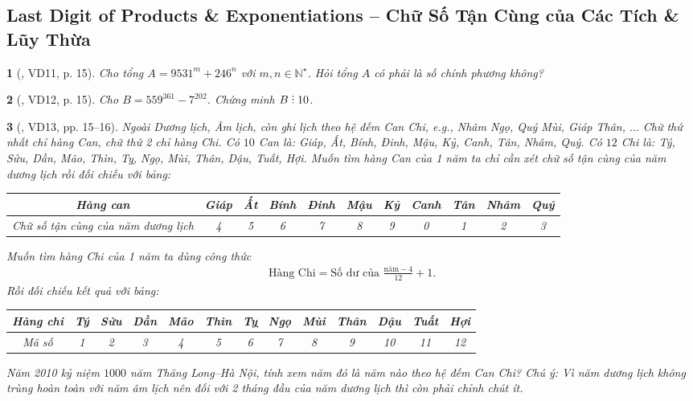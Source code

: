 \documentclass{article}
\newtheorem{baitoan}{}
\DeclareRobustCommand{\divby}{%
	\mathrel{\vbox{\baselineskip.65ex\lineskiplimit0pt\hbox{.}\hbox{.}\hbox{.}}}%
}
\begin{document}

\subsection{Last Digit of Products \& Exponentiations -- Chữ Số Tận Cùng của Các Tích \& Lũy Thừa}

\begin{baitoan}[\cite{Tuyen_Toan_6}, VD11, p. 15]
	Cho tổng $A = 9531^m + 246^n$ với $m,n\in\mathbb{N}^\star$. Hỏi tổng $A$ có phải là số chính phương không?
\end{baitoan}

\begin{baitoan}[\cite{Tuyen_Toan_6}, VD12, p. 15]
	Cho $B = 559^{361} - 7^{202}$. Chứng minh $B\divby10$.
\end{baitoan}

\begin{baitoan}[\cite{Tuyen_Toan_6}, VD13, pp. 15--16]
	Ngoài Dương lịch, Âm lịch, còn ghi lịch theo hệ đếm Can Chi, e.g., Nhâm Ngọ, Quý Mùi, Giáp Thân, $\ldots$ Chữ thứ nhất chỉ hàng Can, chữ thứ 2 chỉ hàng Chi. Có $10$ Can là: Giáp, Ất, Bính, Đinh, Mậu, Kỷ, Canh, Tân, Nhâm, Quý. Có $12$ Chi là: Tý, Sửu, Dần, Mão, Thìn, Tỵ, Ngọ, Mùi, Thân, Dậu, Tuất, Hợi. Muốn tìm hàng Can của 1 năm ta chỉ cần xét chữ số tận cùng của năm dương lịch rồi đối chiếu với bảng:
	\begin{table}[H]
		\centering
		\begin{tabular}{|c|c|c|c|c|c|c|c|c|c|c|}
			\hline
			Hàng can & Giáp & Ất & Bính & Đinh & Mậu & Kỷ & Canh & Tân & Nhâm & Quý \\
			\hline
			Chữ số tận cùng của năm dương lịch & 4 & 5 & 6 & 7 & 8 & 9 & 0 & 1 & 2 & 3 \\
			\hline
		\end{tabular}
	\end{table}
	Muốn tìm hàng Chi của 1 năm ta dùng công thức
	\begin{align*}
		\mbox{Hàng Chi} = \mbox{Số dư của }\frac{\mbox{năm} - 4}{12} + 1.
	\end{align*}
	Rồi đối chiếu kết quả với bảng:
	\begin{table}[H]
		\centering
		\begin{tabular}{|c|c|c|c|c|c|c|c|c|c|c|c|c|}
			\hline
			Hàng chi & Tý & Sửu & Dần & Mão & Thìn & Tỵ & Ngọ & Mùi & Thân & Dậu & Tuất & Hợi \\
			\hline
			Mã số & 1 & 2 & 3 & 4 & 5 & 6 & 7 & 8 & 9 & 10 & 11 & 12 \\
			\hline
		\end{tabular}
	\end{table}
	Năm 2010 kỷ niệm $1000$ năm Thăng Long--Hà Nội, tính xem năm đó là năm nào theo hệ đếm Can Chi? Chú ý: Vì năm dương lịch không trùng hoàn toàn với năm âm lịch nên đối với 2 tháng đầu của năm dương lịch thì còn phải chỉnh chút ít.
\end{baitoan}
\end{document}
